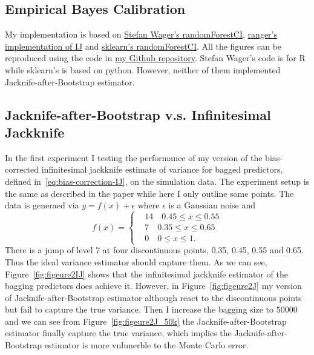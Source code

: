 \documentclass[11pt]{article}
\begin{document}
\subsection{Empirical Bayes Calibration}
My implementation is based on \href{https://github.com/swager/randomForestCI}{Stefan Wager's randomForestCI}, \href{https://github.com/imbs-hl/ranger/blob/master/R/infinitesimalJackknife.R}{ranger's implementation of IJ} and \href{https://github.com/scikit-learn-contrib/forest-confidence-interval}{sklearn's randomForestCI}.
All the figures can be reproduced using the code in \href{https://github.com/liangzp/MATH-5472}{my Github repository}.
Stefan Wager's code is for R while sklearn's is based on python. 
However, neither of them implemented Jacknife-after-Bootstrap estimator.

\subsection{Jacknife-after-Bootstrap v.s. Infinitesimal Jackknife}
\label{sec:Figure_2}
In the first experiment I testing the performance of my version of the bias-corrected infinitesimal jackknife estimate of variance for bagged predictors, defined in~\ref{eq:bias-correction-IJ}, on the simulation data.
The experiment setup is the same as described in the paper while here I only outline some points.
The data is generaed via $y=f(x)+\epsilon$ where $\epsilon$ is a Gaussian noise and 
\begin{equation}
	f(x)=\left\{
	\begin{aligned}
	&14 \quad 0.45 \le x\le 0.55\\
	&7 \quad 0.35 \le x\le 0.65\\
	&0 \quad 0\le x\le 1.
	\end{aligned}
	\right
	.
\end{equation}
There is a jump of level 7 at four discontinuous points, 0.35, 0.45, 0.55 and 0.65. 
Thus the ideal variance estimator should capture them.
As we can see, Figure~\ref{fig:figeure2IJ} shows that the infinitesimal jackknife estimator of the bagging predictors does achieve it.
However, in Figure~\ref{fig:figeure2J} my version of Jacknife-after-Bootstrap estimator although react to the discontinuous points but fail to capture the true variance.
Then I increase the bagging size to $50000$ and we can see from Figure~\ref{fig:figeure2J_50k} the Jacknife-after-Bootstrap estimator finally capture the true variance, which implies the Jacknife-after-Bootstrap estimator is more vulunerble to the Monte Carlo error.
\end{document}

